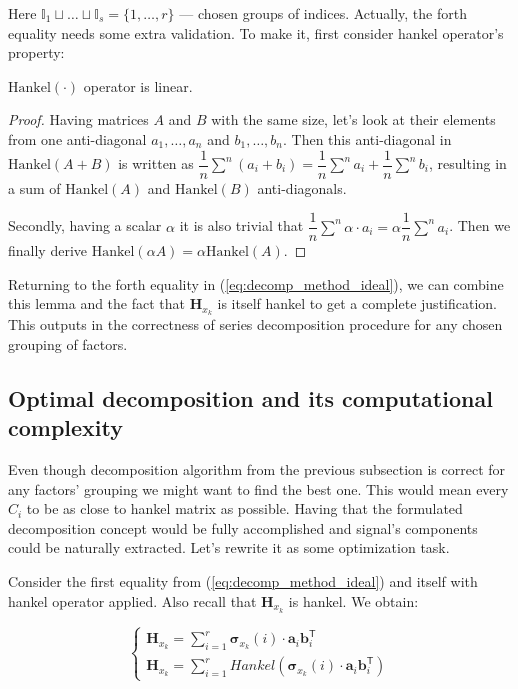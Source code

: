 	Here $ \mathbb{I}_1 \sqcup \ldots \sqcup \mathbb{I}_s = \{1, \ldots, r\} $ --- chosen groups of indices. Actually, the forth equality needs some extra validation. To make it, first consider hankel operator's property:
	
	\begin{Lem}
		$ \text{Hankel}(\cdot) $ operator is linear.
	\end{Lem}
	
	\begin{proof}		
		Having matrices $ A $ and $ B $ with the same size, let's look at their elements from one anti-diagonal $ a_1, \ldots, a_n $ and $ b_1, \ldots, b_n $. Then this anti-diagonal in $ \text{Hankel}(A + B) $ is written as $ \dfrac{1}{n} \sum\limits^n (a_i + b_i) = \dfrac{1}{n} \sum\limits^n a_i + \dfrac{1}{n} \sum\limits^n b_i $, resulting in a sum of  $ \text{Hankel}(A) $ and $ \text{Hankel}(B) $ anti-diagonals.
		
		Secondly, having a scalar $ \alpha $ it is also trivial that $ \dfrac{1}{n} \sum\limits^n \alpha \cdot a_i = \alpha \dfrac{1}{n} \sum\limits^n a_i $. Then we finally derive $ \text{Hankel}(\alpha A) = \alpha \text{Hankel}(A) $.
	\end{proof}
	
	Returning to the forth equality in (\ref{eq:decomp_method_ideal}), we can combine this lemma and the fact that $ \mathbf{H}_{x_k} $ is itself hankel to get a complete justification. This outputs in the correctness of series decomposition procedure for any chosen grouping of factors.
	
	\subsection*{Optimal decomposition and its computational complexity}\label{sec:optimal_decomp}
	
	Even though decomposition algorithm from the previous subsection is correct for any factors' grouping we might want to find the best one. This would mean every $ C_i $ to be as close to hankel matrix as possible. Having that the formulated decomposition concept would be fully accomplished and signal's components could be naturally extracted. Let's rewrite it as some optimization task.
	
	Consider the first equality from (\ref{eq:decomp_method_ideal}) and itself with hankel operator applied. Also recall that $ \mathbf{H}_{x_k} $ is hankel. We obtain:
	
	\begin{equation*}
		\begin{cases*}
			\mathbf{H}_{x_k} = \sum\limits_{i = 1}^{r} \boldsymbol{\sigma}_{x_k}(i) \cdot \mathbf{a}_i  \mathbf{b}_i^{\mathsf{T}} \\
			\mathbf{H}_{x_k} = \sum\limits_{i = 1}^{r} Hankel(\boldsymbol{\sigma}_{x_k}(i) \cdot \mathbf{a}_i  \mathbf{b}_i^{\mathsf{T}})
		\end{cases*}
	\end{equation*}
	
